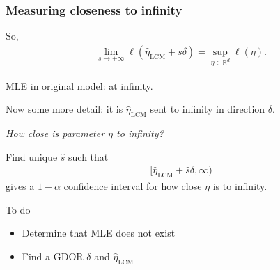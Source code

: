 \documentclass[ 10pt]{beamer}
\def\RR{{\mathbb R}}
\newcommand{\etaLCM}{\hat{\eta}_{\textrm{LCM}}}
\begin{document}
\frame
{
  \frametitle{Measuring closeness to infinity}  
So,
\begin{align*}
	\lim_{s \to +\infty} \ell(\etaLCM + s\delta) = \sup_{\eta \in \RR^d} \ell(\eta).
\end{align*}	

MLE in original model: at infinity.

Now some more detail: it is $\etaLCM$ sent to infinity in direction $\delta$.
\vspace{4mm}


\emph{How close is parameter $\eta$ to infinity?  }
\vspace{2mm}

\pause
Find unique $\hat{s}$ such that
\begin{align*}
[ \etaLCM + \hat{s} \delta, \infty)
\end{align*}
gives a $1 - \alpha$ confidence interval for how close $\eta$ is to infinity.

\pause
\begin{block}{To do}
\begin{itemize}
\item Determine that MLE does not exist
\item Find a GDOR $\delta$ and $\etaLCM$
\end{itemize}
\end{block}
}

%
%
\end{document}
